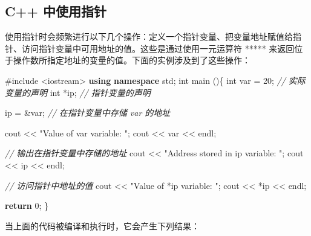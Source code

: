 \documentclass[
]{article}
\newenvironment{Shaded}{}{}
\newcommand{\CommentTok}[1]{\textcolor[rgb]{0.38,0.63,0.69}{\textit{#1}}}
\newcommand{\ControlFlowTok}[1]{\textcolor[rgb]{0.00,0.44,0.13}{\textbf{#1}}}
\newcommand{\DataTypeTok}[1]{\textcolor[rgb]{0.56,0.13,0.00}{#1}}
\newcommand{\DecValTok}[1]{\textcolor[rgb]{0.25,0.63,0.44}{#1}}
\newcommand{\ImportTok}[1]{#1}
\newcommand{\KeywordTok}[1]{\textcolor[rgb]{0.00,0.44,0.13}{\textbf{#1}}}
\newcommand{\NormalTok}[1]{#1}
\newcommand{\OperatorTok}[1]{\textcolor[rgb]{0.40,0.40,0.40}{#1}}
\newcommand{\PreprocessorTok}[1]{\textcolor[rgb]{0.74,0.48,0.00}{#1}}
\newcommand{\StringTok}[1]{\textcolor[rgb]{0.25,0.44,0.63}{#1}}
\begin{document}
\hypertarget{c-ux4e2dux4f7fux7528ux6307ux9488}{%
\subsection{C++ 中使用指针}\label{c-ux4e2dux4f7fux7528ux6307ux9488}}

使用指针时会频繁进行以下几个操作：定义一个指针变量、把变量地址赋值给指针、访问指针变量中可用地址的值。这些是通过使用一元运算符
***** 来返回位于操作数所指定地址的变量的值。下面的实例涉及到了这些操作：

\begin{Shaded}
\begin{Highlighting}[]
\PreprocessorTok{\#include }\ImportTok{\textless{}iostream\textgreater{}}
\KeywordTok{using} \KeywordTok{namespace}\NormalTok{ std}\OperatorTok{;}
\DataTypeTok{int}\NormalTok{ main }\OperatorTok{()\{}
   \DataTypeTok{int}\NormalTok{  var }\OperatorTok{=} \DecValTok{20}\OperatorTok{;}   \CommentTok{// 实际变量的声明}
   \DataTypeTok{int}  \OperatorTok{*}\NormalTok{ip}\OperatorTok{;}        \CommentTok{// 指针变量的声明}

\NormalTok{   ip }\OperatorTok{=} \OperatorTok{\&}\NormalTok{var}\OperatorTok{;}       \CommentTok{// 在指针变量中存储 var 的地址}

\NormalTok{   cout }\OperatorTok{\textless{}\textless{}} \StringTok{"Value of var variable: "}\OperatorTok{;}
\NormalTok{   cout }\OperatorTok{\textless{}\textless{}}\NormalTok{ var }\OperatorTok{\textless{}\textless{}}\NormalTok{ endl}\OperatorTok{;}

   \CommentTok{// 输出在指针变量中存储的地址}
\NormalTok{   cout }\OperatorTok{\textless{}\textless{}} \StringTok{"Address stored in ip variable: "}\OperatorTok{;}
\NormalTok{   cout }\OperatorTok{\textless{}\textless{}}\NormalTok{ ip }\OperatorTok{\textless{}\textless{}}\NormalTok{ endl}\OperatorTok{;}

   \CommentTok{// 访问指针中地址的值}
\NormalTok{   cout }\OperatorTok{\textless{}\textless{}} \StringTok{"Value of *ip variable: "}\OperatorTok{;}
\NormalTok{   cout }\OperatorTok{\textless{}\textless{}} \OperatorTok{*}\NormalTok{ip }\OperatorTok{\textless{}\textless{}}\NormalTok{ endl}\OperatorTok{;}

   \ControlFlowTok{return} \DecValTok{0}\OperatorTok{;}
\OperatorTok{\}}
\end{Highlighting}
\end{Shaded}

当上面的代码被编译和执行时，它会产生下列结果：
\end{document}
